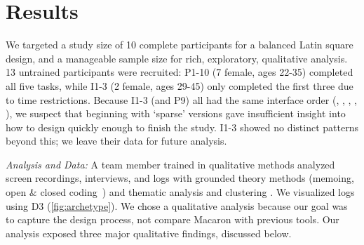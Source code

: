 \section{Results}
 
%
%

We targeted a study size of 10 complete participants for a balanced Latin square design, and a manageable sample size for rich, exploratory, qualitative analysis. %
13 untrained  participants were recruited: P1-10  (7 female, ages 22-35) completed all five tasks, while I1-3 (2 female, ages 29-45) 
only completed the first three %
due to time restrictions.
Because I1-3 (and P9) all had the same interface order (\lo, \none, \vis, \hi, \select), we suspect that beginning with `sparse' versions gave insufficient insight into how to design quickly enough to finish the study. %
I1-3 showed no distinct patterns beyond this; we leave their data for future analysis.  
 
%



\emph{Analysis and Data:} A team member %
trained in qualitative methods analyzed screen recordings, interviews, and logs with grounded theory methods (memoing, open \& closed coding~\cite{Corbin2008}) and thematic analysis and clustering \cite{Moustakas1994}.
We visualized logs using D3 (\autoref{fig:archetype}). 
%
We chose a qualitative analysis because our goal was to capture the design process, not compare Macaron with previous tools.
Our analysis exposed three major qualitative findings, discussed below.

